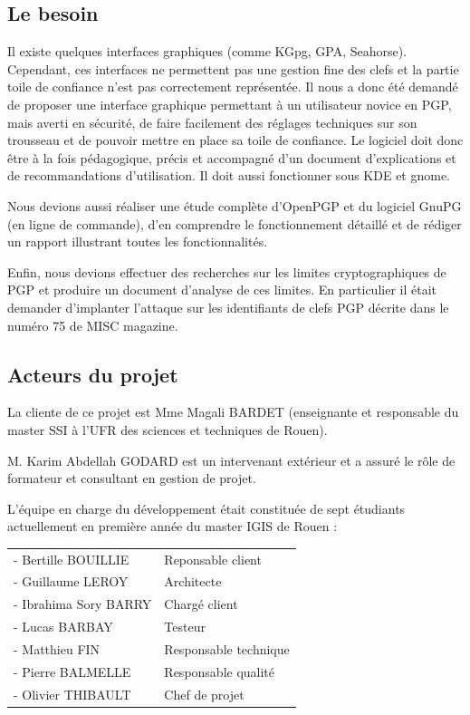 \documentclass{../res/univ-projet}
\begin{document}
  \subsection{Le besoin}
    Il existe quelques interfaces graphiques (comme KGpg, GPA, Seahorse). 
    Cependant, ces interfaces ne permettent pas une gestion fine des clefs 
    et la partie toile de confiance n’est pas correctement représentée.
    Il nous a donc été demandé de proposer une interface graphique 
    permettant à un utilisateur novice en PGP, mais averti en sécurité, 
    de faire facilement des réglages techniques sur son trousseau et de pouvoir 
    mettre en place sa toile de confiance. Le logiciel doit donc être à la 
    fois pédagogique, précis et accompagné d'un document d’explications et 
    de recommandations d’utilisation. Il doit aussi fonctionner sous KDE et 
    gnome.
  
    Nous devions aussi réaliser une étude complète d'OpenPGP et du 
    logiciel GnuPG (en ligne de commande), d’en comprendre le 
    fonctionnement détaillé et de rédiger un rapport illustrant toutes 
    les fonctionnalités.

    Enfin, nous devions effectuer des recherches sur les limites 
    cryptographiques de PGP et produire un document d’analyse de ces 
    limites. En particulier il était demander d'implanter l’attaque sur les 
    identifiants de clefs PGP décrite dans le numéro 75 de MISC magazine.
    
  \subsection{Acteurs du projet}
    La cliente de ce projet est Mme Magali BARDET (enseignante et responsable 
    du master SSI à l'UFR des sciences et techniques de Rouen). 

    M. Karim Abdellah GODARD est un intervenant extérieur et a assuré le 
    rôle de formateur et consultant en gestion de projet.

    L'équipe en charge du développement était constituée de sept étudiants actuellement en première année du master IGIS de Rouen : 

    \begin{tabular}{ll}
    - Bertille BOUILLIE & Reponsable client \\
    - Guillaume LEROY & Architecte \\
    - Ibrahima Sory BARRY & Chargé client \\
    - Lucas BARBAY & Testeur \\
    - Matthieu FIN & Responsable technique \\
    - Pierre BALMELLE & Responsable qualité \\
    - Olivier THIBAULT & Chef de projet \\
    \end{tabular}
    
\end{document}
